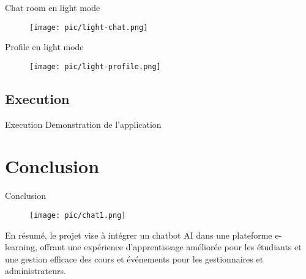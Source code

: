 \documentclass{beamer}
\begin{document}
\begin{frame}{Chat room en light mode}
    \begin{figure}[htpb]
        \centering
        \texttt{[image: pic/light-chat.png]}
    \end{figure}
\end{frame}

\begin{frame}{Profile en light mode}
    \begin{figure}[htpb]
        \centering
        \texttt{[image: pic/light-profile.png]}
    \end{figure}
\end{frame}

\subsection{Execution}
\begin{frame}{Execution}
    Demonstration de l'application
\end{frame}

\section{Conclusion}

\begin{frame}{Conclusion}
    \begin{figure}[htpb]
        \centering
        \texttt{[image: pic/chat1.png]}
    \end{figure}
    En résumé, le projet vise à intégrer un chatbot AI dans une plateforme e-learning, offrant une expérience d’apprentissage améliorée pour les étudiants et une gestion efficace des cours et événements pour les gestionnaires et administrateurs.
\end{frame}
\end{document}
